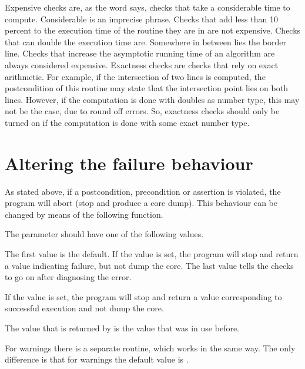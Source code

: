Expensive checks are, as the word says, checks that take a considerable
time to compute. 
Considerable is an imprecise phrase. 
Checks that add less than 10 percent to the execution time of the routine 
they are in are not expensive.
Checks that can double the execution time are. 
Somewhere in between lies the border line.
Checks that increase the asymptotic running time of an algorithm are always 
considered expensive.
Exactness checks are checks that rely on exact arithmetic. 
For example, if the intersection of two lines is computed, the postcondition 
of this routine may state that the intersection point lies on both lines. 
However, if the computation is done with doubles as number type, this may not 
be the case, due to round off errors. 
So, exactness checks should only be turned on if the computation is done 
with some exact number type.

\section{Altering the failure behaviour}

As stated above, if a postcondition, precondition or assertion is
violated, the program will abort (stop and produce a core dump).
This behaviour can be changed by means of the following function.


\ccGlueBegin
{}
\ccGlueEnd

The parameter should have one of the following values.

The first value is the default. 
If the  value is set, the program will stop and return a value 
indicating failure, but not dump the core. 
The last value tells the checks to go on after diagnosing the error.

\begin{ccAdvanced}
If the  value is set, the program will stop and 
return a value corresponding to successful execution and not dump the core. 
\end{ccAdvanced}

The value that is returned by  is the value that was in use before.

For warnings there is a separate routine, which works in the same way.
The only difference is that for warnings the default value is
.

